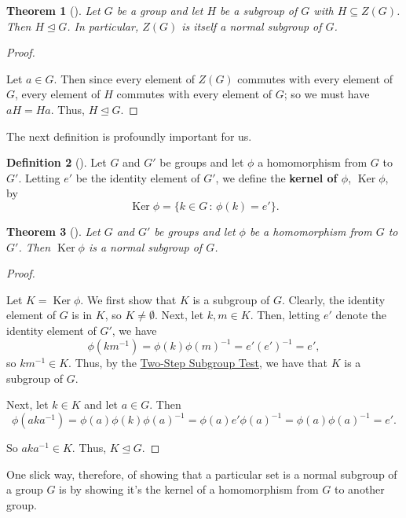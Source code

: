 \documentclass[10pt,openany,oneside]{book}
\newcommand{\terminology}[1]{\textbf{#1}}
\theoremstyle{plain}
\newtheorem{theorem}{Theorem}[section]
\theoremstyle{definition}
\newtheorem{definition}[theorem]{Definition}
\theoremstyle{definition}
\theoremstyle{definition}
\theoremstyle{definition}
\numberwithin{equation}{section}
\DeclareMathOperator{\Ker}{Ker}
\begin{document}
\begin{theorem}[{}]\label{znorm}
Let \(G\) be a group and let \(H\) be a subgroup of \(G\) with \(H\subseteq Z(G)\). Then \(H\unlhd G\). In particular, \(Z(G)\) is itself a normal subgroup of \(G\).%
\end{theorem}
\begin{proof}\hypertarget{proof-42}{}
Let \(a\in G\). Then since every element of \(Z(G)\) commutes with every element of \(G\), every element of \(H\) commutes with every element of \(G\); so we must have \(aH=Ha\). Thus, \(H\unlhd G\).%
\end{proof}
The next definition is profoundly important for us.%
\begin{definition}[{}]\label{definition-67}
\label{notation-75}
Let \(G\) and \(G'\) be groups and let \(\phi\) a homomorphism from \(G\) to \(G'\). Letting \(e'\) be the identity element of \(G'\), we define the \terminology{kernel of \(\phi\)}, \(\Ker
\phi\), by%
\begin{equation*}
\Ker \phi = \{k\in G\,:\,\phi(k)=e'\}.
\end{equation*}
%
\end{definition}
\begin{theorem}[{}]\label{theorem-54}
Let \(G\) and \(G'\) be groups and let \(\phi\) be a homomorphism from \(G\) to \(G'\). Then \(\Ker \phi\) is a normal subgroup of \(G\).%
\end{theorem}
\begin{proof}\hypertarget{proof-43}{}
Let \(K=\Ker \phi\). We first show that \(K\) is a subgroup of \(G\). Clearly, the identity element of \(G\) is in \(K\), so \(K\neq
\emptyset\). Next, let \(k,m\in K\). Then, letting \(e'\) denote the identity element of \(G'\), we have%
\begin{equation*}
\phi(km^{-1})=\phi(k)\phi(m)^{-1}=e'(e')^{-1}=e',
\end{equation*}
so \(km^{-1}\in
K\). Thus, by the \hyperref[twostep]{Two-Step Subgroup Test}, we have that \(K\) is a subgroup of \(G\).%
\par
Next, let \(k\in K\) and let \(a\in G\). Then%
\begin{equation*}
\phi(aka^{-1})=\phi(a)\phi(k)\phi(a)^{-1}=\phi(a)e'\phi(a)^{-1}=\phi(a)\phi(a)^{-1}=e'.
\end{equation*}
%
\par
So \(aka^{-1}\in K\). Thus, \(K \unlhd G\).%
\end{proof}
One slick way, therefore, of showing that a particular set is a normal subgroup of a group \(G\) is by showing it's the kernel of a homomorphism from \(G\) to another group.%
\end{document}
